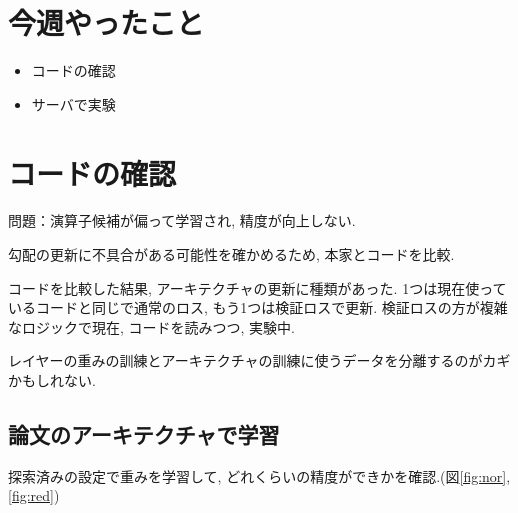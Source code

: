 \documentclass[twocolumn]{jarticle}     %
\begin{document}


\section{今週やったこと}
\begin{itemize}
	\item {コードの確認}
  \item {サーバで実験}
\end{itemize}

\section{コードの確認}
問題：演算子候補が偏って学習され, 精度が向上しない.

勾配の更新に不具合がある可能性を確かめるため, 本家とコードを比較.

コードを比較した結果, アーキテクチャの更新に種類があった.
1つは現在使っているコードと同じで通常のロス, もう1つは検証ロスで更新.
検証ロスの方が複雑なロジックで現在, コードを読みつつ, 実験中.

レイヤーの重みの訓練とアーキテクチャの訓練に使うデータを分離するのがカギかもしれない.

\subsection{論文のアーキテクチャで学習}
探索済みの設定で重みを学習して, どれくらいの精度ができかを確認.(図\ref{fig:nor}, \ref{fig:red})
\end{document}
